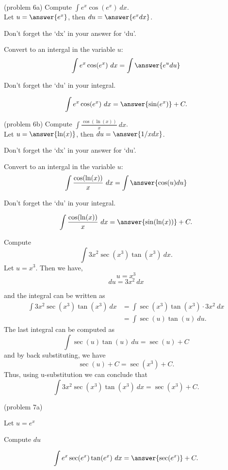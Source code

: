 \documentclass{ximera}
\begin{document}
\begin{problem}(problem 6a) Compute $\displaystyle{\int e^x\cos(e^x) \ dx}$.\\
Let $u = \answer{e^x}$, then $du = \answer{e^x dx}$.\\
\begin{hint}
Don't forget the `dx' in your answer for `du'.
\end{hint}
Convert to an intergal in the variable $u$:
\[\int e^x\cos(e^x) \ dx = \int\answer{e^u du}\]
\begin{hint}
Don't forget the `du' in your integral.
\end{hint}

\[\int e^x\cos(e^x) \ dx = \answer{\sin(e^x)} +C.\]
\end{problem}

\begin{problem}(problem 6b) Compute $\displaystyle{\int \frac{\cos(\ln(x))}{x} \ dx}$.\\
Let $u = \answer{\ln(x)}$, then $du = \answer{1/x dx}$.\\
\begin{hint}
Don't forget the `dx' in your answer for `du'.
\end{hint}
Convert to an intergal in the variable $u$:
\[\int \frac{\cos(\ln(x))}{x} \ dx = \int\answer{\cos(u) du}\]
\begin{hint}
Don't forget the `du' in your integral.
\end{hint}

\[\int \frac{\cos(\ln(x))}{x} \ dx = \answer{\sin(\ln(x))} +C.\]
\end{problem}


\begin{example}[example 7] Compute 
\[\int 3x^2\sec(x^3)\tan(x^3) \ dx.\]
Let $u = x^3$.  Then we have,
\[u = x^3\]
\[du = 3x^2 \ dx\]

and the integral can be written as 
\begin{align*}
\int 3x^2\sec(x^3)\tan(x^3) \ dx &= \int \sec(x^3)\tan(x^3) \cdot 3x^2 \ dx\\
&= \int \sec(u)\tan(u) \ du.
\end{align*}
The last integral can be computed as 
\[\int \sec(u)\tan(u) \ du = \sec(u) + C\]
and by back substituting, we have 
\[\sec(u) + C = \sec(x^3) + C.\]
Thus, using u-substitution we can conclude that
\[\int 3x^2\sec(x^3)\tan(x^3) \ dx =  \sec(x^3) + C.\]
\end{example}

\begin{problem}(problem 7a)
\begin{hint}
Let $u = e^x$
\end{hint}
\begin{hint}
Compute $du$
\end{hint}
\[\int e^x\sec(e^x)\tan(e^x) \ dx = \answer{\sec(e^x)} +C.\]
\end{problem}
\end{document}
